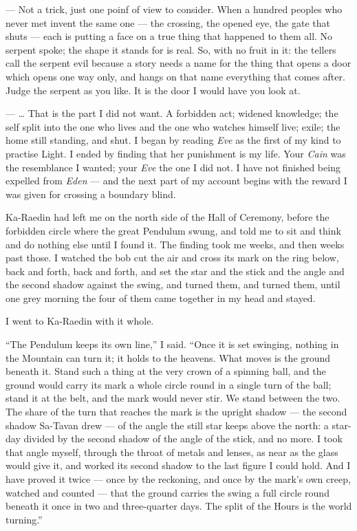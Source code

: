 \begin{room}
--- Not a trick, just one poinf of view to consider. When a hundred peoples who never met invent the same one --- the crossing, the opened eye, the gate that shuts --- each is putting a face on a true thing that happened to them all. No serpent spoke; the shape it stands for is real. So, with no fruit in it: the tellers call the serpent evil because a story needs a name for the thing that opens a door which opens one way only, and hangs on that name everything that comes after. Judge the serpent as you like. It is the door I would have you look at.

--- \ldots{} That is the part I did not want. A forbidden act; widened knowledge; the self split into the one who lives and the one who watches himself live; exile; the home still standing, and shut. I began by reading \textit{Eve} as the first of my kind to practise Light. I ended by finding that her punishment is my life. Your \textit{Cain} was the resemblance I wanted; your \textit{Eve} the one I did not. I have not finished being expelled from \textit{Eden} --- and the next part of my account begins with the reward I was given for crossing a boundary blind.

\end{room}

Ka-Raedin had left me on the north side of the Hall of Ceremony, before the forbidden circle where the great Pendulum swung, and told me to sit and think and do nothing else until I found it. The finding took me weeks, and then weeks past those. I watched the bob cut the air and cross its mark on the ring below, back and forth, back and forth, and set the star and the stick and the angle and the second shadow against the swing, and turned them, and turned them, until one grey morning the four of them came together in my head and stayed.\par

I went to Ka-Raedin with it whole.\par

``The Pendulum keeps its own line,'' I said. ``Once it is set swinging, nothing in the Mountain can turn it; it holds to the heavens. What moves is the ground beneath it. Stand such a thing at the very crown of a spinning ball, and the ground would carry its mark a whole circle round in a single turn of the ball; stand it at the belt, and the mark would never stir. We stand between the two. The share of the turn that reaches the mark is the upright shadow --- the second shadow Sa-Tavan drew --- of the angle the still star keeps above the north: a star-day divided by the second shadow of the angle of the stick, and no more. I took that angle myself, through the throat of metals and lenses, as near as the glass would give it, and worked its second shadow to the last figure I could hold. And I have proved it twice --- once by the reckoning, and once by the mark's own creep, watched and counted --- that the ground carries the swing a full circle round beneath it once in two and three-quarter days. The split of the Hours is the world turning.''\par

